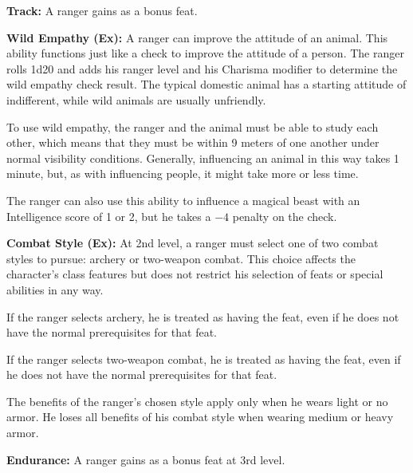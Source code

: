 
\textbf{Track:} A ranger gains  as a bonus feat.

\textbf{Wild Empathy (Ex):} A ranger can improve the attitude of an animal. This ability functions just like a  check to improve the attitude of a person. The ranger rolls 1d20 and adds his ranger level and his Charisma modifier to determine the wild empathy check result. The typical domestic animal has a starting attitude of indifferent, while wild animals are usually unfriendly.

To use wild empathy, the ranger and the animal must be able to study each other, which means that they must be within 9 meters of one another under normal visibility conditions. Generally, influencing an animal in this way takes 1 minute, but, as with influencing people, it might take more or less time.

The ranger can also use this ability to influence a magical beast with an Intelligence score of 1 or 2, but he takes a $-4$ penalty on the check.

\textbf{Combat Style (Ex):} At 2nd level, a ranger must select one of two combat styles to pursue: archery or two-weapon combat. This choice affects the character's class features but does not restrict his selection of feats or special abilities in any way.

If the ranger selects archery, he is treated as having the  feat, even if he does not have the normal prerequisites for that feat.

If the ranger selects two-weapon combat, he is treated as having the  feat, even if he does not have the normal prerequisites for that feat.

The benefits of the ranger's chosen style apply only when he wears light or no armor. He loses all benefits of his combat style when wearing medium or heavy armor.

\textbf{Endurance:} A ranger gains  as a bonus feat at 3rd level.

